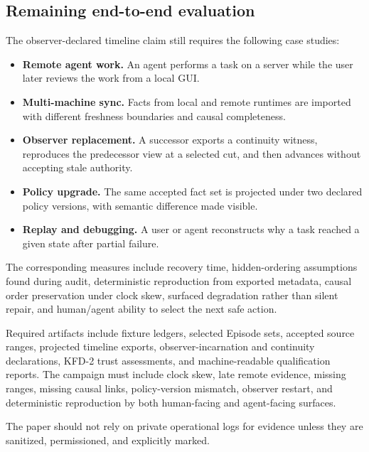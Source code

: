 \subsection{Remaining end-to-end evaluation}

The observer-declared timeline claim still requires the following case studies:

\begin{itemize}[leftmargin=*]
  \item \textbf{Remote agent work.} An agent performs a task on a server while
        the user later reviews the work from a local GUI.
  \item \textbf{Multi-machine sync.} Facts from local and remote runtimes are
        imported with different freshness boundaries and causal completeness.
  \item \textbf{Observer replacement.} A successor exports a continuity
        witness, reproduces the predecessor view at a selected cut, and then
        advances without accepting stale authority.
  \item \textbf{Policy upgrade.} The same accepted fact set is projected under
        two declared policy versions, with semantic difference made visible.
  \item \textbf{Replay and debugging.} A user or agent reconstructs why a task
        reached a given state after partial failure.
\end{itemize}

The corresponding measures include recovery time, hidden-ordering assumptions
found during audit, deterministic reproduction from exported metadata, causal
order preservation under clock skew, surfaced degradation rather than silent
repair, and human/agent ability to select the next safe action.

Required artifacts include fixture ledgers, selected Episode sets, accepted
source ranges, projected timeline exports, observer-incarnation and continuity
declarations, KFD-2 trust assessments, and machine-readable qualification
reports. The campaign must include clock skew, late remote evidence, missing
ranges, missing causal links, policy-version mismatch, observer restart, and
deterministic reproduction by both human-facing and agent-facing surfaces.

The paper should not rely on private operational logs for evidence unless they
are sanitized, permissioned, and explicitly marked.
